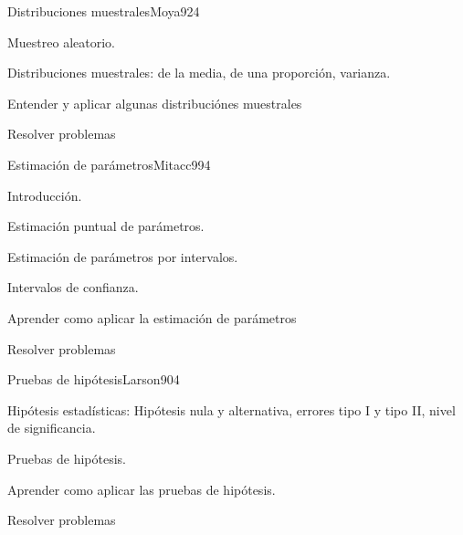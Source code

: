 \begin{syllabus}
\begin{unit}{Distribuciones muestrales}{Moya92}{4}
   \begin{topics}
         \item  Muestreo aleatorio.
	 \item  Distribuciones muestrales: de la media, de una proporción, varianza.
   \end{topics}

   \begin{unitgoals}
         \item  Entender y aplicar algunas distribuciónes muestrales
         \item  Resolver problemas
   \end{unitgoals}
\end{unit}

\begin{unit}{Estimación de parámetros}{Mitacc99}{4}
   \begin{topics}
         \item  Introducción.
	 \item  Estimación puntual de parámetros.
	\item Estimación de parámetros por intervalos.
	\item Intervalos de confianza.
   \end{topics}

   \begin{unitgoals}
         \item  Aprender como aplicar la estimación de parámetros
         \item  Resolver problemas
   \end{unitgoals}
\end{unit}

\begin{unit}{Pruebas de hipótesis}{Larson90}{4}
   \begin{topics}
         \item  Hipótesis estadísticas: Hipótesis nula y alternativa, errores tipo I y tipo II, nivel de significancia.
	 \item  Pruebas de hipótesis.
   \end{topics}

   \begin{unitgoals}
         \item  Aprender como aplicar las pruebas de hipótesis.
         \item  Resolver problemas
   \end{unitgoals}
\end{unit}

\begin{coursebibliography}
\end{coursebibliography}

\end{syllabus}
